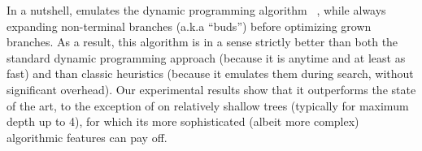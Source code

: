 \documentclass{article}
\begin{document}
In a nutshell, \blossom emulates the dynamic programming algorithm \dleight~\cite{dl8}, while always expanding non-terminal branches (a.k.a ``buds'') before optimizing grown branches. As a result, this algorithm is in a sense strictly better than both the standard dynamic programming approach (because it is anytime and at least as fast) and than classic heuristics (because it emulates them during search, without significant overhead).
Our experimental results show that it outperforms the state of the art, to the exception of \murtree on relatively shallow trees (typically for maximum depth up to 4), for which its more sophisticated (albeit more complex) algorithmic features can pay off.
\end{document}

